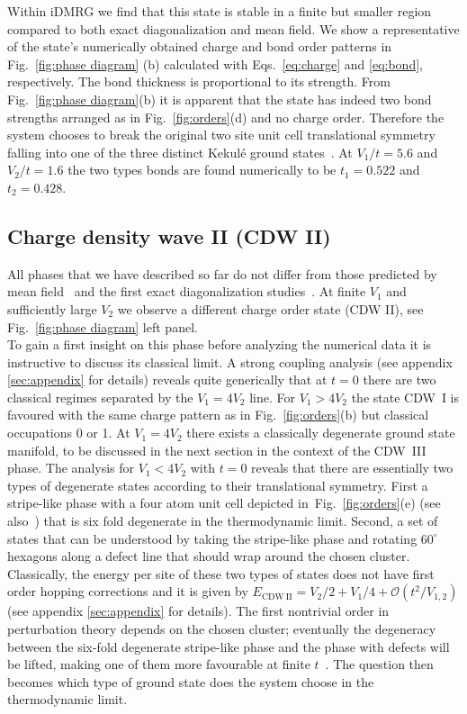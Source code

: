 \documentclass[aps,prx,10pt,twocolumn,floatfix,superscriptaddress,showpacs,numerical,footinbib]{revtex4-1}
\begin{document}
Within iDMRG we find that this state is stable in a finite but smaller region compared to both 
exact diagonalization and mean field.
%
We show a representative of the state's numerically obtained charge and bond order patterns in Fig.~\ref{fig:phase diagram} (b) 
calculated with Eqs.~\eqref{eq:charge} and \eqref{eq:bond}, respectively.
%
The bond thickness is proportional to its strength.
%
From Fig.~\ref{fig:phase diagram}(b) it is apparent that the state has indeed two bond strengths arranged as in Fig.~\ref{fig:orders}(d) 
and no charge order.
%
Therefore the system chooses to break the original two site unit cell translational symmetry 
falling into one of the three distinct Kekul\'{e} ground states~\cite{WF10}. 
%
At $V_{1}/t=5.6$ and $V_{2}/t=1.6$ the two types bonds are found numerically to be 
$t_{1}=0.522$ and $t_{2}=0.428$.

\subsection{Charge density wave II (CDW II)}
%
All phases that we have described so far do not differ
from those predicted by mean field~\cite{RQHZ08,WF10,PR12,GCC13} 
and the first exact diagonalization studies~\cite{GGNVC13,DH14,DCH14}.
%
At finite $V_{1}$ and sufficiently large $V_{2}$ we observe
a different charge order state (CDW II), see Fig.~\ref{fig:phase diagram} left panel.\\
%
To gain a first insight on this phase before analyzing the numerical data it is instructive to discuss its classical limit.
%
A strong coupling analysis (see appendix \ref{sec:appendix} for details) reveals quite generically 
that at $t=0$ there are two classical regimes separated by the $V_{1}=4V_{2}$ line. 
%
For $V_{1}>4V_{2}$ the state CDW~I is favoured with the same charge pattern as in Fig.~\ref{fig:orders}(b) but classical occupations 0 or 1.
%
At $V_{1}=4V_{2}$ there exists a classically degenerate ground state manifold, to be discussed in the next section in the context of the CDW~III phase.
%
The analysis for $V_{1}<4V_{2}$ with $t=0$ reveals that there are essentially two types of degenerate states according to their translational symmetry.
%
First a stripe-like phase with a four atom unit cell depicted in~Fig.~\ref{fig:orders}(e) (see also~\cite{CL15}) that is six fold
degenerate in the thermodynamic limit.
%
Second, a set of states that can be understood by taking the stripe-like phase and rotating $60^{\circ}$ hexagons along a defect line that should wrap
around the chosen cluster.
%
Classically, the energy per site of these two types of states does not have first order hopping corrections and it is given by
$E_{\mathrm{CDW~II}} = V_2/2+V_1/4 + \mathcal{O}(t^2/V_{1,2})$ (see appendix \ref{sec:appendix} for details). 
%
The first nontrivial order in perturbation theory depends on the chosen cluster; eventually 
the degeneracy between the six-fold degenerate stripe-like phase and the phase with defects will be lifted, 
making one of them more favourable at finite $t$~\cite{CL15}.
%
The question then becomes which type of ground state does the system choose in the thermodynamic limit.\\
%
\end{document}
